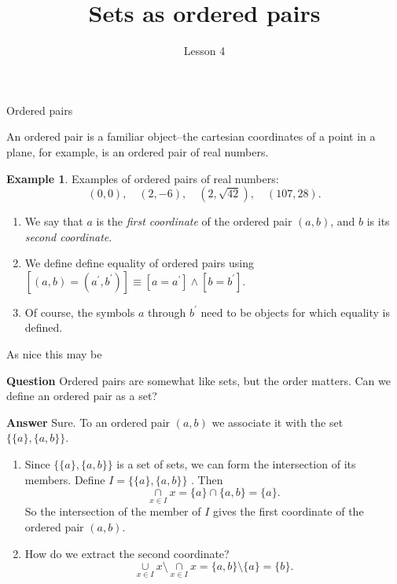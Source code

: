 \documentclass[fleqn]{beamer}
\subtitle{Lesson 4}
\title{\textbf{Sets as ordered pairs}}
\date{}
\theoremstyle{definition}
\newtheorem{myex}{Example}
\newenvironment{checklist}{
  \begin{enumerate}[\ding{51}]
    \addtolength{\itemsep}{-0.0\itemsep}}
  {\end{enumerate}}
\begin{document}
\frame{\titlepage}

\begin{frame}{Ordered pairs}

An ordered pair is a familiar object--the cartesian coordinates of a point in a plane, for example, is an ordered pair of real numbers.  

\begin{myex}
Examples of ordered pairs of real numbers:
\[
    (0,0), \quad (2,-6),  \quad  (2, \sqrt{42}), \quad   (107, 28).
\]
\end{myex}

\begin{checklist}

\item We say that \(a\) is the \emph{first coordinate} of the ordered pair \((a,b)\), and \(b\) is its \emph{second coordinate}.

\item  We define define equality of ordered pairs using   \([ (a,b) = (a^\prime, b^\prime)]   \equiv  [a = a^\prime] \land  [b = b^\prime] \).  

\item Of course, the symbols \(a\) through \(b^\prime\) need to be objects for which equality is defined.
\end{checklist}

\end{frame}
\begin{frame}{As nice this may be}

\textbf{Question} Ordered pairs are somewhat like sets, but the order matters.  Can we define an ordered pair as a set?

\textbf{Answer}   Sure.  To an ordered pair \((a,b)\) we associate it with the set  \(\{\{a\}, \{a,b\}\} \).  

\vspace{0.2in}

\begin{checklist}

\item Since \(\{\{a\}, \{a,b\}\} \) is  a set of sets, we can form the intersection of its members. Define  \(I = \{\{a\}, \{a,b\}\} \) . Then
\[
   \underset{x \in I}{\cap} x =  \{a\} \cap \{a,b\} = \{a\}.
\]
So the intersection of the member of \(I\) gives the first coordinate of the ordered pair \((a,b)\).

\item How do we extract the second coordinate?
\[
    \underset{x \in I}{\cup} x   \setminus \underset{x \in I}{\cap} x  = \{a,b\} \setminus \{a\} = \{b\}.
\]



\end{checklist}


\end{frame}
\end{document}
